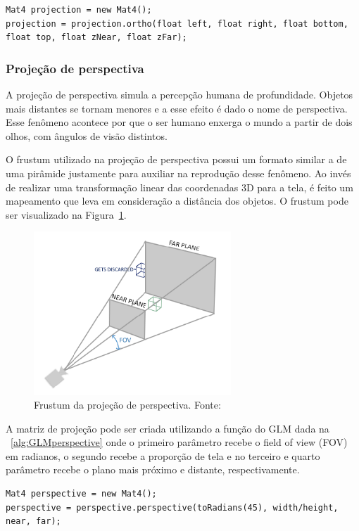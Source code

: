 \documentclass[12pt, 
openright, 
oneside, 
a4paper,    
brazil]{facom-ufu-abntex2}
\begin{document}
\begin{lstlisting}[caption=Função Ortho do GLM, label={alg:GLMortho}
]
Mat4 projection = new Mat4();
projection = projection.ortho(float left, float right, float bottom, float top, float zNear, float zFar);
\end{lstlisting}

\subsubsection{Projeção de perspectiva}
A projeção de perspectiva simula a percepção humana de profundidade. Objetos mais distantes se tornam menores e a esse efeito é dado o nome de perspectiva. Esse fenômeno acontece por que o ser humano enxerga o mundo a partir de dois olhos, com ângulos de visão distintos.

O frustum utilizado na projeção de perspectiva possui um formato similar a de uma pirâmide justamente para auxiliar na reprodução desse fenômeno. Ao invés de realizar uma transformação linear das coordenadas 3D para a tela, é feito um mapeamento que leva em consideração a distância dos objetos. O frustum pode ser visualizado na Figura~\ref{fig:perspectiveProjection}.

\begin{figure}[H]
	\centering
	\includegraphics[width=20em]{imagens/perspectiveProjection.png}
	\caption{Frustum da projeção de perspectiva. Fonte:~\cite{LearnOpenGL}}
	\label{fig:perspectiveProjection}
\end{figure}

A matriz de projeção pode ser criada utilizando a função do GLM dada na \lstlistingname~\ref{alg:GLMperspective} onde o primeiro parâmetro recebe o field of view (FOV) em radianos, o segundo recebe a proporção de tela e no terceiro e quarto parâmetro recebe o plano mais próximo e distante, respectivamente.

\begin{lstlisting}[caption=Função Perspective do GLM, label={alg:GLMperspective}
]
Mat4 perspective = new Mat4();
perspective = perspective.perspective(toRadians(45), width/height, near, far);
\end{lstlisting}
\end{document}
